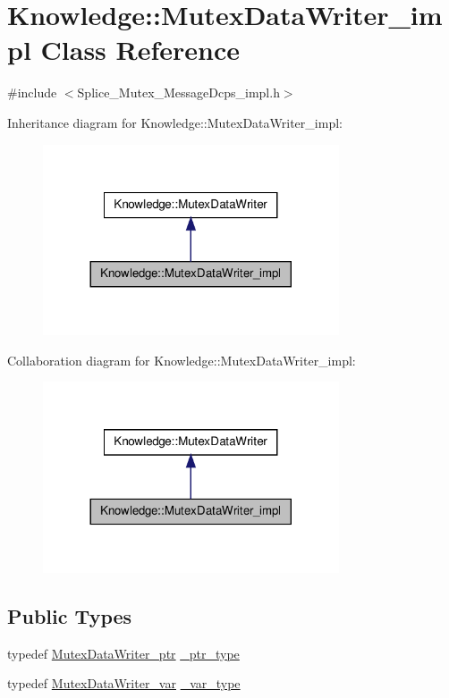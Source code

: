 \hypertarget{classKnowledge_1_1MutexDataWriter__impl}{
\section{Knowledge::MutexDataWriter\_\-impl Class Reference}
\label{df/dc5/classKnowledge_1_1MutexDataWriter__impl}
}


{\ttfamily \#include $<$Splice\_\-Mutex\_\-MessageDcps\_\-impl.h$>$}



Inheritance diagram for Knowledge::MutexDataWriter\_\-impl:
\nopagebreak
\begin{figure}[H]
\begin{center}
\leavevmode
\includegraphics[width=248pt]{d3/d4d/classKnowledge_1_1MutexDataWriter__impl__inherit__graph}
\end{center}
\end{figure}


Collaboration diagram for Knowledge::MutexDataWriter\_\-impl:
\nopagebreak
\begin{figure}[H]
\begin{center}
\leavevmode
\includegraphics[width=248pt]{d4/d20/classKnowledge_1_1MutexDataWriter__impl__coll__graph}
\end{center}
\end{figure}
\subsection*{Public Types}
\begin{DoxyCompactItemize}
\item 
typedef \hyperlink{classKnowledge_1_1MutexDataWriter}{MutexDataWriter\_\-ptr} \hyperlink{classKnowledge_1_1MutexDataWriter_a3770228b7ac3f52d1d49afe8d016bead}{\_\-ptr\_\-type}
\item 
typedef \hyperlink{namespaceKnowledge_a6883244ee070735ab1d7ad34821094fd}{MutexDataWriter\_\-var} \hyperlink{classKnowledge_1_1MutexDataWriter_a71f41386a05e03eb544638b42e64cddf}{\_\-var\_\-type}
\end{DoxyCompactItemize}
